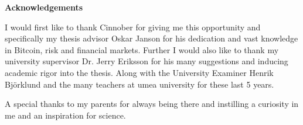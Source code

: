 \vspace*{7cm}

\centering \textbf{Acknowledgements}

I would first like to thank Cinnober for giving me this opportunity and specifically my thesis advisor Oskar Janson for his dedication and vast knowledge in Bitcoin, risk and financial markets.
Further I would also like to thank my university supervisor Dr. Jerry Eriksson for his many suggestions and inducing academic rigor into the thesis. Along with the University Examiner Henrik Bj\"{o}rklund and the many teachers at umea university for these last 5 years. 
  
A special thanks to my parents for always being there and instilling a curiosity in me and an inspiration for science. 
